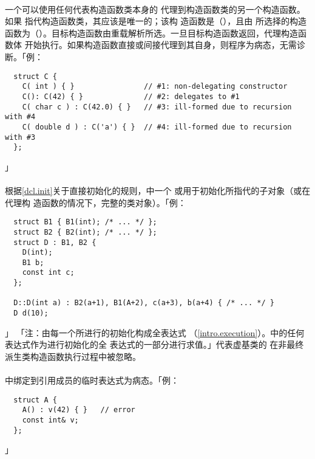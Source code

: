 \paragraph{}
一个可以使用任何代表构造函数类本身的
代理到构造函数类的另一个构造函数。如果
指代构造函数类，其应该是唯一的；该构
造函数是（），且由
所选择的构造函数为（）。目标构造函数由重载解析所选。一旦目标构造函数返回，代理构造函数体
开始执行。如果构造函数直接或间接代理到其自身，则程序为病态，无需诊断。「例：
\begin{lstlisting}
  struct C {
    C( int ) { }                // #1: non-delegating constructor
    C(): C(42) { }              // #2: delegates to #1
    C( char c ) : C(42.0) { }   // #3: ill-formed due to recursion with #4
    C( double d ) : C('a') { }  // #4: ill-formed due to recursion with #3
  };
\end{lstlisting}」

\paragraph{}
根据\ref{dcl.init}关于直接初始化的规则，中一个
或用于初始化所指代的子对象（或在代理构
造函数的情况下，完整的类对象）。「例：
\begin{lstlisting}
  struct B1 { B1(int); /* ... */ };
  struct B2 { B2(int); /* ... */ };
  struct D : B1, B2 {
    D(int);
    B1 b;
    const int c;
  };

  D::D(int a) : B2(a+1), B1(A+2), c(a+3), b(a+4) { /* ... */ }
  D d(10);
\end{lstlisting}」
「注：由每一个所进行的初始化构成全表达式
（\ref{intro.execution}）。中的任何表达式作为进行初始化的全
表达式的一部分进行求值。」代表虚基类的
在非最终派生类构造函数执行过程中被忽略。

\paragraph{}
中绑定到引用成员的临时表达式为病态。「例：
\begin{lstlisting}
  struct A {
    A() : v(42) { }   // error
    const int& v;
  };
\end{lstlisting}」

